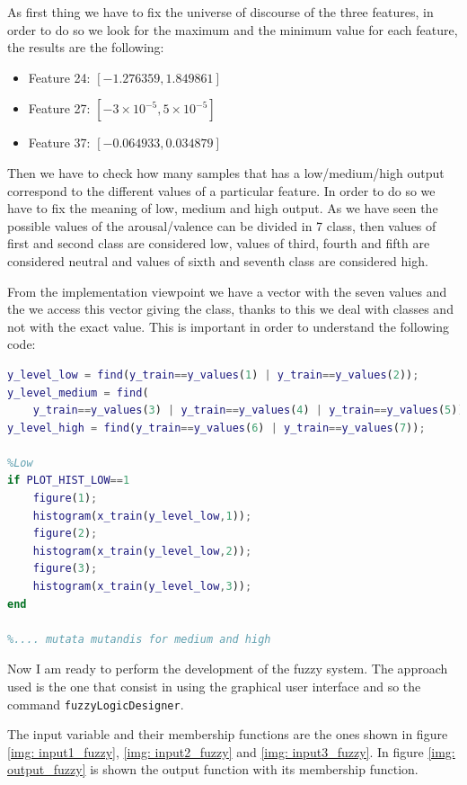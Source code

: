 \documentclass[a4paper]{report}
\begin{document}
	
	\noindent As first thing we have to fix the universe of discourse of the three features, in order to do so we look for the maximum and the minimum value for each feature, the results are the following:
	\begin{itemize}
		\item Feature 24: $[-1.276359,1.849861]$
 		\item Feature 27: $[-3 \times 10^{-5}, 5 \times 10^{-5}]$
		\item Feature 37: $[-0.064933, 0.034879]$
	\end{itemize}
	
	\noindent Then we have to check how many samples that has a low/medium/high output correspond to the different values of a particular feature. In order to do so we have to fix the meaning of low, medium and high output. As we have seen the possible values of the arousal/valence can be divided in 7 class, then values of first and second class are considered low, values of third, fourth and fifth are considered neutral and values of sixth and seventh class are considered high.
	
	\noindent From the implementation viewpoint we have a vector with the seven values and the we access this vector giving the class, thanks to this we deal with classes and not with the exact value. This is important in order to understand the following code:
	\begin{lstlisting}[language=Matlab]
y_level_low = find(y_train==y_values(1) | y_train==y_values(2));
y_level_medium = find(
	y_train==y_values(3) | y_train==y_values(4) | y_train==y_values(5));
y_level_high = find(y_train==y_values(6) | y_train==y_values(7));
		
%Low
if PLOT_HIST_LOW==1
	figure(1);
	histogram(x_train(y_level_low,1));
	figure(2);
	histogram(x_train(y_level_low,2));
	figure(3);
	histogram(x_train(y_level_low,3));
end
		
%.... mutata mutandis for medium and high
	\end{lstlisting}
	
	\noindent Now I am ready to perform the development of the fuzzy system. The approach used is the one that consist in using the graphical user interface and so the command \texttt{fuzzyLogicDesigner}.
	
	\noindent The input variable and their membership functions are the ones shown in figure \ref{img: input1_fuzzy}, \ref{img: input2_fuzzy} and \ref{img: input3_fuzzy}. In figure \ref{img: output_fuzzy} is shown the output function with its membership function.
	
\end{document}
